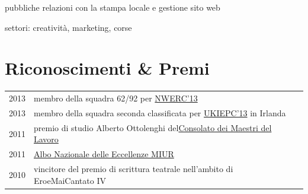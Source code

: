 \documentclass[a4paper]{deedy-resume} %
\begin{document}
\begin{minipage}[t]{0.66\textwidth}
\begin{tightitemize}
\item pubbliche relazioni con la stampa locale e gestione sito web
\end{tightitemize}

\sectionspace %



\begin{tightitemize}
\item settori: creatività, marketing, corse
\end{tightitemize}

\sectionspace %


\section{Riconoscimenti \& Premi} 

\begin{tabular}{rll}
2013	 & membro della squadra 62/92 per \href{http://www.nwerc.eu/}{NWERC'13}\\
2013	 & membro della squadra seconda classificata per \href{http://www.cs.nott.ac.uk/~mlw/ukiepc/}{UKIEPC'13} in Irlanda\\
2011	 & premio di studio Alberto Ottolenghi del\href{http://www.maestrilavoro.it/index/elenco_consolati/it-toscana-pisa.html}{Consolato dei Maestri del Lavoro}\\
2011	 & \href{http://www.indire.it/eccellenze/}{Albo Nazionale delle Eccellenze MIUR}\\
2010	 & vincitore del premio di scrittura teatrale nell'ambito di EroeMaiCantato IV\\
\end{tabular}

\sectionspace %


\end{minipage} %
\end{document}
